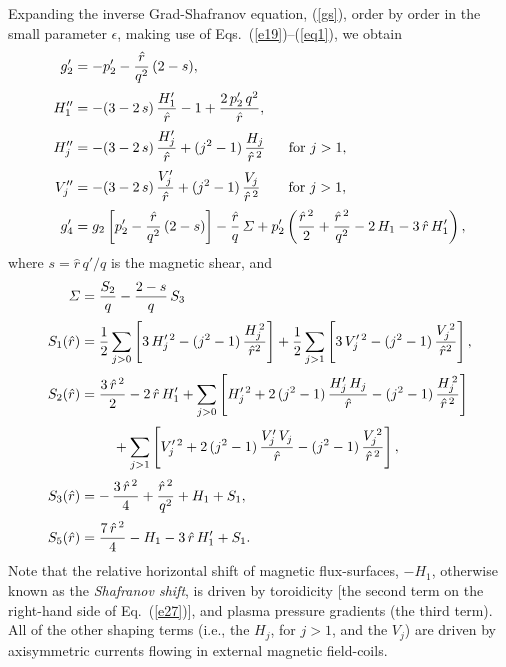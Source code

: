 \documentclass[12pt,prb,aps,notitlepage]{revtex4-1}
\begin{document}
Expanding the inverse Grad-Shafranov equation, (\ref{gs}), order by order in the
small parameter $\epsilon$, making use of Eqs.~(\ref{e19})--(\ref{eq1}), we obtain
\begin{align}
g_2'&=- p_2' - \frac{\hat{r}}{q^2}\,(2-s),\label{e26}\\[0.5ex]
H_1''&= -(3-2\,s)\,\frac{H_1' }{\hat{r}}
-1+\frac{2\,p_2'\,q^2}{\hat{r}},\label{e27}\\[0.5ex]
H_j''&= -(3-2\,s)\,\frac{H_j'}{\hat{r}}+(j^2-1)\,\frac{H_j}{\hat{r}^{\,2}}~~~~~\mbox{for $j>1$},\label{e33x}\\[0.5ex]
V_j''&= -(3-2\,s)\,\frac{V_j'}{\hat{r}}+(j^2-1)\,\frac{V_j}{\hat{r}^{\,2}}~~~~~~\mbox{for $j>1$},\label{e28}\\[0.5ex]
g_4'&= g_2\left[p_2' - \frac{\hat{r}}{q^2}\,(2-s)\right] - \frac{\hat{r}}{q}\,{\mit\Sigma}
+p_2'\left(\frac{\hat{r}^{\,2}}{2}+\frac{\hat{r}^{\,2}}{q^2}-2\,H_1-3\,\hat{r}\,H_1'\right),\label{e31}
\end{align}
where $s=\hat{r}\,q'/q$ is the magnetic shear, and  
\begin{align}{\mit\Sigma} &=\frac{S_2}{q}- \frac{2-s}{q}\,S_3\\[0.5ex]
S_1(\hat{r})&=\frac{1}{2}\sum_{j>0} \left[3\,H_j'^{\,2} -(j^2-1)\,\frac{H_j^{\,2}}{\hat{r}^2}\right]
 +\frac{1}{2}\sum_{j>1} \left[3\,V_j'^{\,2} -(j^2-1)\,\frac{V_j^{\,2}}{\hat{r}^2}\right],\label{e109}
\\[0.5ex]
S_2(\hat{r})&=\frac{3\,\hat{r}^{\,2}}{2} -2\,\hat{r}\,H_1'+\sum_{j>0}\left[H_j'^{\,2}+2\,(j^2-1)\,\frac{H_j'\,H_j}{\hat{r}}-(j^2-1)\,\frac{H_j^{\,2}}{\hat{r}^{\,2}}\right]\nonumber\\[0.5ex]
&\phantom{===}+\sum_{j>1}\left[V_j'^{\,2}+2\,(j^2-1)\,\frac{V_j'\,V_j}{\hat{r}}-(j^2-1)\,\frac{V_j^{\,2}}{\hat{r}^{\,2}}\right],\\[0.5ex]
S_3(\hat{r})&=-\,\frac{3\,\hat{r}^{\,2}}{4}+\frac{\hat{r}^{\,2}}{q^2} +H_1+S_1,\\[0.5ex]
S_5(\hat{r}) &= \frac{7\,\hat{r}^{\,2}}{4}-H_1 -3\,\hat{r}\,H_1' + S_1.
\end{align}
Note that the relative horizontal shift of magnetic flux-surfaces, $-H_1$, otherwise known as the {\em Shafranov shift}, is driven by toroidicity [the second term on
the right-hand side of Eq.~(\ref{e27})], and plasma pressure gradients (the third term). All of the other shaping terms (i.e., the $H_j$, for $j>1$, and
the $V_j$) are driven by axisymmetric currents flowing in external  magnetic field-coils.
\end{document}
